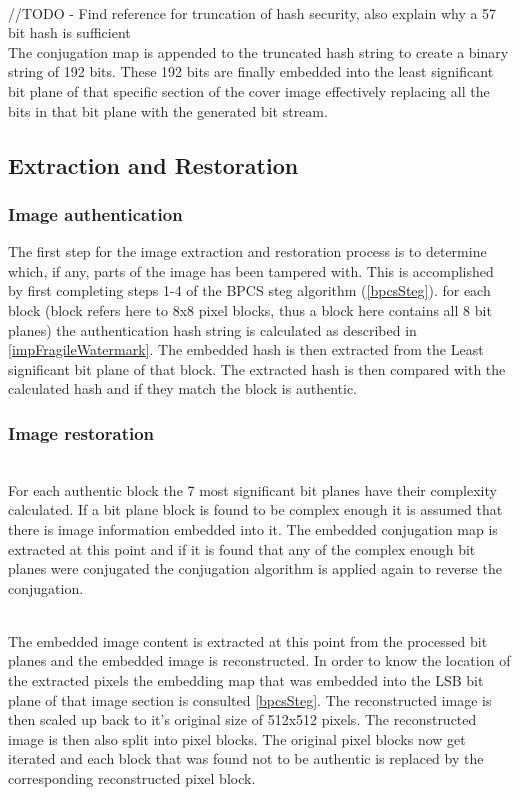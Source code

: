 \documentclass[12pt]{article}
\begin{document}
\hspace{0pt} \\
//TODO - Find reference for truncation of hash security, also explain why a 57 bit hash is sufficient
\hspace{0pt} \\

The conjugation map is appended to the truncated hash string to create a binary string of 192 bits.
These 192 bits are finally embedded into the least significant bit plane of that specific section of the cover image effectively replacing all the bits in that bit plane with the generated bit stream.

\subsection{Extraction and Restoration}

\subsubsection{Image authentication}
The first step for the image extraction and restoration process is to determine which, if any, parts of the image has been tampered with.
This is accomplished by first completing steps 1-4 of the BPCS steg algorithm (\ref{bpcsSteg}).
for each block (block refers here to 8x8 pixel blocks, thus a block here contains all 8 bit planes) the authentication hash string is calculated as described in \ref{impFragileWatermark}. 
The embedded hash is then extracted from the Least significant bit plane of that block.
The extracted hash is then compared with the calculated hash and if they match the block is authentic.

\subsubsection{Image restoration}
\hspace{0pt} \\
For each authentic block the 7 most significant bit planes have their complexity calculated.
If a bit plane block is found to be complex enough it is assumed that there is image information embedded into it.
The embedded conjugation map is extracted at this point and if it is found that any of the complex enough bit planes were conjugated the conjugation algorithm is applied again to reverse the conjugation.

\hspace{0pt} \\
The embedded image content is extracted at this point from the processed bit planes and the embedded image is reconstructed.
In order to know the location of the extracted pixels the embedding map that was embedded into the LSB bit plane of that image section is consulted \ref{bpcsSteg}.
The reconstructed image is then scaled up back to it's original size of 512x512 pixels.
The reconstructed image is then also split into pixel blocks.
The original pixel blocks now get iterated and each block that was found not to be authentic is replaced by the corresponding reconstructed pixel block. 
\end{document}
